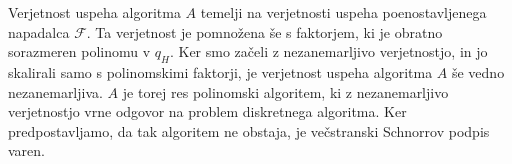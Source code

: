 \begin{dokaz}
Verjetnost uspeha algoritma $A$ temelji na verjetnosti uspeha poenostavljenega napadalca $\mathcal{F}$.
Ta verjetnost je pomnožena še s faktorjem, ki je obratno sorazmeren polinomu v $q_H$. Ker smo
začeli z nezanemarljivo verjetnostjo, in jo skalirali samo s polinomskimi faktorji, je verjetnost
uspeha algoritma $A$ še vedno nezanemarljiva. $A$ je torej res polinomski algoritem, ki z
nezanemarljivo verjetnostjo vrne odgovor na problem diskretnega algoritma. Ker predpostavljamo, da
tak algoritem ne obstaja, je večstranski Schnorrov podpis varen.
\end{dokaz}
